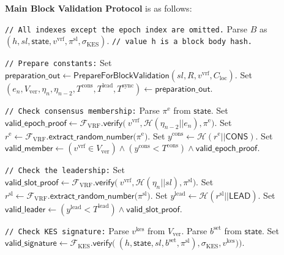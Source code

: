 \bigbreak
\bigbreak
\noindent
\textbf{Main Block Validation Protocol} is as follows:
\begin{protocol}
    \caption{$\textsf{IsValidBlock}(P, R, B, C_{\text{loc}})$}
    \begin{algorithmic}[1]
        \noindent
        \lstinline|// All indexes except the epoch index are omitted.|
        \State Parse $B$ as ${(h, sl, \textsf{state}, v^{\text{vrf}}, \pi^{\text{sl}}, \sigma_{\text{KES}})}$. \lstinline|// value h is a block body hash.|

        \noindent
        \lstinline|// Prepare constants:|
        \State Set $\textsf{preparation\_out} \leftarrow \textsf{PrepareForBlockValidation}(sl, R, v^{\text{vrf}}, C_{\text{loc}})$.
        \State Set $(e_n, V_{\text{ver}}, \eta_{n}, \eta_{n - 2}, T^{\text{cons}}, T^{\text{lead}}, T^{\text{sync}}) \leftarrow \textsf{preparation\_out}$.

        \noindent
        \lstinline|// Check consensus membership:|
        \State Parse ${\pi^{\text{e}}}$ from $\textsf{state}$.
        \State Set $\textsf{valid\_epoch\_proof} \leftarrow \mathcal{F}_{\text{VRF}}\textsf{.verify(}\
        v^{\text{vrf}}, \mathcal{H}(\eta_{n - 2} || e_n),\pi^{\text{e}} \textsf{)}$.
        \State Set ${r^{\text{e}} \leftarrow \mathcal{F}_{\text{VRF}}\textsf{.extract\_random\_number(}\pi^{\text{e}}\textsf{)}}$.
        \State Set ${y^{\text{cons}} \leftarrow {\mathcal{H}(r^{\text{e}} || \textsf{CONS})}}$.
        \State Set ${\textsf{valid\_member} \leftarrow (v^{\text{vrf}} \in V_{\text{ver}}) \wedge (y^{\text{cons}} < T^{\text{cons}}) \wedge \textsf{valid\_epoch\_proof}}$.

        \noindent
        \lstinline|// Check the leadership:|
        \State Set $\textsf{valid\_slot\_proof} \leftarrow \mathcal{F}_{\text{VRF}}\textsf{.verify(}\
        v^{\text{vrf}}, \mathcal{H}(\eta_n || sl),\pi^{\text{sl}} \textsf{)}$.
        \State Set ${r^{\text{sl}} \leftarrow \mathcal{F}_{\text{VRF}}\textsf{.extract\_random\_number(}\pi^{\text{sl}}\textsf{)}}$.
        \State Set ${y^{\text{lead}} \leftarrow {\mathcal{H}(r^{\text{sl}} || \textsf{LEAD})}}$.
        \State Set ${\textsf{valid\_leader} \leftarrow (y^{\text{lead}} < T^{\text{lead}}) \wedge \textsf{valid\_slot\_proof}}$.

        \noindent
        \lstinline|// Check KES signature:|
        \State Parse $v^{\text{kes}}$ from $V_{\text{ver}}$.
        \State Parse $b^{\text{set}}$ from $\textsf{state}$.
        \State Set $\textsf{valid\_signature} \leftarrow \mathcal{F}_{\text{KES}}\textsf{.verify(}\
        (h, \textsf{state}, sl, b^{\text{set}}, \pi^{\text{sl}}), \sigma_{\text{KES}}, v^{\text{kes}}) \textsf{)}$.


\end{algorithmic}
\end{protocol}
